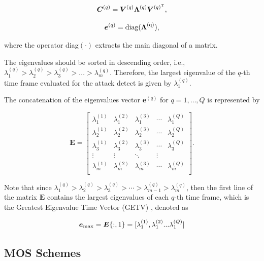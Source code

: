 \begin{equation}\label{eq:eq06}
\boldsymbol{C}^{(q)} = \boldsymbol{V}^{(q)}\boldsymbol{\Lambda}^{(q)}\boldsymbol{V}^{(q)^{\rm T}},
\end{equation}

\begin{equation}\label{eq:eq060}
\boldsymbol{e}^{(q)} = \rm diag(\boldsymbol{\Lambda}^{(q)}),
\end{equation}

where the operator diag$(\cdot)$ extracts the main diagonal of a matrix.

The eigenvalues should be sorted in descending order, i.e., $\lambda_{1}^{(q)} > \lambda_{2}^{(q)} > \lambda_{3}^{(q)} > ... > \lambda_{m}^{(q)}$. Therefore, the largest eigenvalue of the $q$-th time frame evaluated for the attack detect is given by $\lambda_{1}^{(q)}$.

The concatenation of the eigenvalues vector $\boldsymbol{e}^{(q)}$ for $q = 1, \ldots, Q$ is represented by

\begin{equation}\label{eq:eq07}
\boldsymbol{E} =
\begin{bmatrix}
  \lambda_1^{(1)} & \lambda_1^{(2)} & \lambda_1^{(3)} & \cdots & \lambda_1^{(Q)} \\
  \lambda_2^{(1)} & \lambda_2^{(2)} & \lambda_2^{(3)} & \cdots & \lambda_2^{(Q)} \\
  \lambda_3^{(1)} & \lambda_3^{(2)} & \lambda_3^{(3)} & \cdots & \lambda_3^{(Q)} \\
  \vdots & \vdots & \ddots & \vdots  \\
  \lambda_m^{(1)} & \lambda_m^{(2)} & \lambda_m^{(3)} & \cdots & \lambda_m^{(Q)} \\
\end{bmatrix}.
\end{equation}

Note that since $\lambda_1^{(q)} > \lambda_2^{(q)} > \lambda_3^{(q)} > \cdots > \lambda_{m-1}^{(q)} > \lambda_m^{(q)}$, then the first line of the matrix $\boldsymbol{E}$ contains the largest eigenvalues of each $q$-th time frame, which is the Greatest Eigenvalue Time
Vector (GETV) \cite{tenorio2013greatest}, denoted as 

\begin{equation}\label{eq:eq08}
\boldsymbol{e}_{\rm max} = \boldsymbol{E}\{:,1\} = [ \lambda_1^{(1)}, \lambda_1^{(2)} ... \lambda_1^{(Q)}]
\end{equation}

\subsection{MOS Schemes}
\label{sec:2_prop_MOSSchemes}

